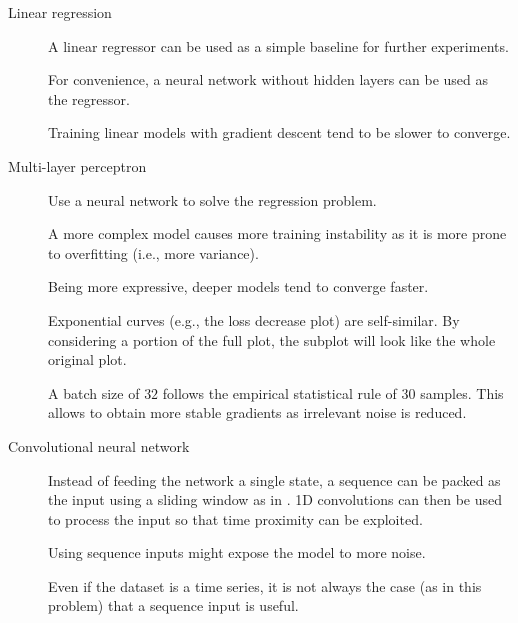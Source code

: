 \begin{description}
    \item[Linear regression]
        A linear regressor can be used as a simple baseline for further experiments.

        \begin{remark}
            For convenience, a neural network without hidden layers can be used as the regressor.
        \end{remark}

        \begin{remark}
            Training linear models with gradient descent tend to be slower to converge.
        \end{remark}

    \item[Multi-layer perceptron]
        Use a neural network to solve the regression problem.

        \begin{remark}
            A more complex model causes more training instability as it is more prone to overfitting (i.e., more variance).
        \end{remark}

        \begin{remark}
            Being more expressive, deeper models tend to converge faster.
        \end{remark}

        \begin{remark}
            Exponential curves (e.g., the loss decrease plot) are self-similar. By considering a portion of the full plot, the subplot will look like the whole original plot.
        \end{remark}

        \begin{remark}
            A batch size of $32$ follows the empirical statistical rule of $30$ samples. This allows to obtain more stable gradients as irrelevant noise is reduced.
        \end{remark}

    \item[Convolutional neural network]
        Instead of feeding the network a single state, a sequence can be packed as the input using a sliding window as in . 1D convolutions can then be used to process the input so that time proximity can be exploited.

        \begin{remark}
            Using sequence inputs might expose the model to more noise.
        \end{remark}

        \begin{remark}
            Even if the dataset is a time series, it is not always the case (as in this problem) that a sequence input is useful.
        \end{remark}
\end{description}

